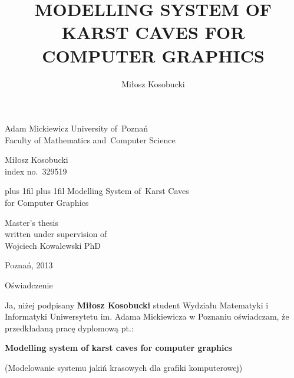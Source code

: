 \documentclass[twoside,openright,a4paper,12pt]{memoir}
\theoremstyle{definition}
\begin{document}
\title{MODELLING SYSTEM OF KARST CAVES FOR COMPUTER GRAPHICS}
\author{Miłosz Kosobucki}


\thispagestyle{empty}
\begin{center}
 \begin{LARGE}
   Adam Mickiewicz University of~Poznań\\
   Faculty of Mathematics and~Computer Science\\
   \vspace{2.5cm}
   \begin{huge}
     Miłosz Kosobucki\\
     \small{index no.~329519}\\
   \end{huge}
   \vspace{2.5cm}
   \begin{Huge}
     \leftskip=-3cm plus 1fil\rightskip=-3cm plus 1fil
     Modelling System of~Karst Caves\\ for Computer Graphics\\
   \end{Huge}
   \vspace{2.5cm}
    \begin{flushleft}
      \hsize
      \large
      Master's thesis\\
      written under supervision of\\
      Wojciech Kowalewski PhD\\
    \end{flushleft}
    \vspace{2.5cm}
    Poznań, 2013
 \end{LARGE}
\end{center}
\newpage

\listoftodos
\newpage\null\thispagestyle{empty}\newpage

\begin{center}
  \LARGE{Oświadczenie}
\end{center}

Ja, niżej podpisany \textbf{Miłosz Kosobucki} student Wydziału
Matematyki i Informatyki Uniwersytetu im. Adama Mickiewicza w Poznaniu
oświadczam, że przedkładaną pracę dyplomową pt.:

\textbf{Modelling system of karst caves for computer graphics}

(Modelowanie systemu jakiń krasowych dla grafiki komputerowej)
\end{document}
